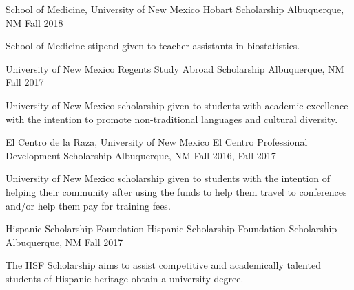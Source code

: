 \begin{cventries}

\cventry
{School of Medicine, University of New Mexico} %
{Hobart Scholarship} %
{Albuquerque, NM} %
{Fall 2018} %
{
\begin{cvitems} %
\item School of Medicine stipend given to teacher assistants in biostatistics.
  \end{cvitems}
}


\cventry
{University of New Mexico} %
{Regents Study Abroad Scholarship} %
{Albuquerque, NM} %
{Fall 2017} %
{
\begin{cvitems} %
\item University of New Mexico scholarship given to students with academic excellence with the intention to promote \newline non-traditional languages and cultural diversity.
  \end{cvitems}
}


\cventry
{El Centro de la Raza, University of New Mexico} %
{El Centro Professional Development Scholarship} %
{Albuquerque, NM} %
{Fall 2016, Fall 2017} %
{
\begin{cvitems} %
\item University of New Mexico scholarship given to students with the intention of helping their community after using \newline the funds to help them travel to conferences and/or help them pay for training fees.
  \end{cvitems}
}


\cventry
{Hispanic Scholarship Foundation} %
{Hispanic Scholarship Foundation Scholarship} %
{Albuquerque, NM} %
{Fall 2017} %
{
\begin{cvitems} %
\item The HSF Scholarship aims to assist competitive and academically talented students of Hispanic heritage obtain a university degree. 
  \end{cvitems}
}


\end{cventries}
